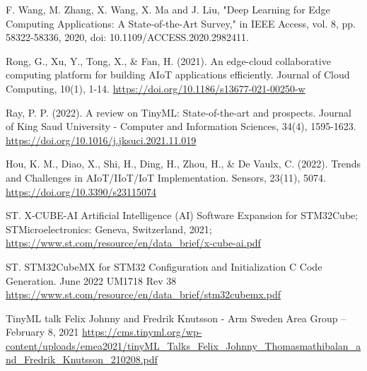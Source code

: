 \begin{thebibliography}{00}
F. Wang, M. Zhang, X. Wang, X. Ma and J. Liu, "Deep Learning for Edge Computing Applications: A State-of-the-Art Survey," in IEEE Access, vol. 8, pp. 58322-58336, 2020, doi: 10.1109/ACCESS.2020.2982411.

Rong, G., Xu, Y., Tong, X., & Fan, H. (2021). An edge-cloud collaborative computing platform for building AIoT applications efficiently. Journal of Cloud Computing, 10(1), 1-14. 
\url{https://doi.org/10.1186/s13677-021-00250-w}

Ray, P. P. (2022). A review on TinyML: State-of-the-art and prospects. Journal of King Saud University - Computer and Information Sciences, 34(4), 1595-1623.
\url{https://doi.org/10.1016/j.jksuci.2021.11.019}

Hou, K. M., Diao, X., Shi, H., Ding, H., Zhou, H., & De Vaulx, C. (2022). Trends and Challenges in AIoT/IIoT/IoT Implementation. Sensors, 23(11), 5074.
\url{https://doi.org/10.3390/s23115074}

ST. X-CUBE-AI Artificial Intelligence (AI) Software Expansion for STM32Cube; STMicroelectronics: Geneva, Switzerland, 2021;
\url{https://www.st.com/resource/en/data_brief/x-cube-ai.pdf}

ST. STM32CubeMX for STM32 Configuration and Initialization C Code Generation. June 2022 UM1718 Rev 38
\url{https://www.st.com/resource/en/data_brief/stm32cubemx.pdf}

TinyML talk Felix Johnny and Fredrik Knutsson - Arm Sweden Area Group – February 8, 2021
\url{https://cms.tinyml.org/wp-content/uploads/emea2021/tinyML_Talks_Felix_Johnny_Thomasmathibalan_and_Fredrik_Knutsson_210208.pdf}

\end{thebibliography}